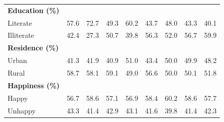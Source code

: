 \documentclass[12pt, a4paper]{article}
\begin{document}
\begin{appendices}
\begin{table}[!h]
{\begin{tabular}{lcccccccc}
        \midrule
        \textbf{Education (\%)}                                                                                                                                                                                                                                    \\
        \quad Literate     & 57.6                                & 72.7                                & 49.3                                & 60.2                                & 43.7              & 48.0              & 43.3              & 40.1              \\
        \quad Illiterate   & 42.4                                & 27.3                                & 50.7                                & 39.8                                & 56.3              & 52.0              & 56.7              & 59.9              \\
        \midrule
        \textbf{Residence (\%)}                                                                                                                                                                                                                                    \\
        \quad Urban        & 41.3                                & 41.9                                & 40.9                                & 51.0                                & 43.4              & 50.0              & 49.9              & 48.2              \\
        \quad Rural        & 58.7                                & 58.1                                & 59.1                                & 49.0                                & 56.6              & 50.0              & 50.1              & 51.8              \\
        \midrule
        \textbf{Happiness (\%)}                                                                                                                                                                                                                                    \\
        \quad Happy        & 56.7                                & 58.6                                & 57.1                                & 56.9                                & 58.4              & 60.2              & 58.6              & 57.7              \\
        \quad Unhappy      & 43.3                                & 41.4                                & 42.9                                & 43.1                                & 41.6              & 39.8              & 41.4              & 42.3              \\

\end{tabular}}
\end{table}
\end{appendices}
\end{document}

